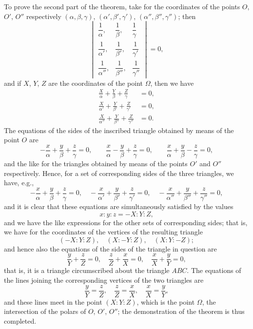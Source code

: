 \documentclass[11pt,a4paper]{article}
\begin{document}
To prove the second part of the theorem, take for the coordinates of the points
$O$, $O'$, $O''$ respectively $(\alpha, \beta, \gamma)$, $(\alpha', \beta', \gamma')$, $(\alpha'', \beta'', \gamma'')$; then
\[
\begin{vmatrix}
\dfrac{1}{\alpha}, & \dfrac{1}{\beta}, & \dfrac{1}{\gamma} \\[1ex]
\dfrac{1}{\alpha'}, & \dfrac{1}{\beta'}, & \dfrac{1}{\gamma'} \\[1ex]
\dfrac{1}{\alpha''}, & \dfrac{1}{\beta''}, & \dfrac{1}{\gamma''}
\end{vmatrix} = 0,
\]
and if $X$, $Y$, $Z$ are the coordinates of the point $\Omega$, then we have
\begin{align*}
\frac{X}{\alpha} + \frac{Y}{\beta} + \frac{Z}{\gamma} &= 0,\\
\frac{X}{\alpha'} + \frac{Y}{\beta'} + \frac{Z}{\gamma'} &= 0,\\
\frac{X}{\alpha''} + \frac{Y}{\beta''} + \frac{Z}{\gamma''} &= 0.
\end{align*}
The equations of the sides of the inscribed triangle obtained by means of the
point $O$ are
\[
-\frac{x}{\alpha} + \frac{y}{\beta} + \frac{z}{\gamma} = 0, \qquad
\frac{x}{\alpha} - \frac{y}{\beta} + \frac{z}{\gamma} = 0, \qquad
\frac{x}{\alpha} + \frac{y}{\beta} - \frac{z}{\gamma} = 0,
\]
and the like for the triangles obtained by means of the points $O'$ and $O''$ respectively.
Hence, for a set of corresponding sides of the three triangles, we have, e.g.,
\[
-\frac{x}{\alpha} + \frac{y}{\beta} + \frac{z}{\gamma} = 0, \quad
-\frac{x}{\alpha'} + \frac{y}{\beta'} + \frac{z}{\gamma'} = 0, \quad
-\frac{x}{\alpha''} + \frac{y}{\beta''} + \frac{z}{\gamma''} = 0,
\]
and it is clear that these equations are simultaneously satisfied by the values
\[
x : y : z = -X : Y : Z,
\]
and we have the like expressions for the other sets of corresponding sides; that is,
we have for the coordinates of the vertices of the resulting triangle
\[
(-X : Y : Z), \quad (X : -Y : Z), \quad (X : Y : -Z);
\]
and hence also the equations of the sides of the triangle in question are
\[
\frac{y}{Y} + \frac{z}{Z} = 0, \quad \frac{z}{Z} + \frac{x}{X} = 0, \quad \frac{x}{X} + \frac{y}{Y} = 0,
\]
that is, it is a triangle circumscribed about the triangle $ABC$. The equations of the
lines joining the corresponding vertices of the two triangles are
\[
\frac{y}{Y} = \frac{z}{Z}, \quad \frac{z}{Z} = \frac{x}{X}, \quad \frac{x}{X} = \frac{y}{Y},
\]
and these lines meet in the point $(X : Y : Z)$, which is the point $\Omega$, the intersection
of the polars of $O$, $O'$, $O''$; the demonstration of the theorem is thus completed.
\end{document}
